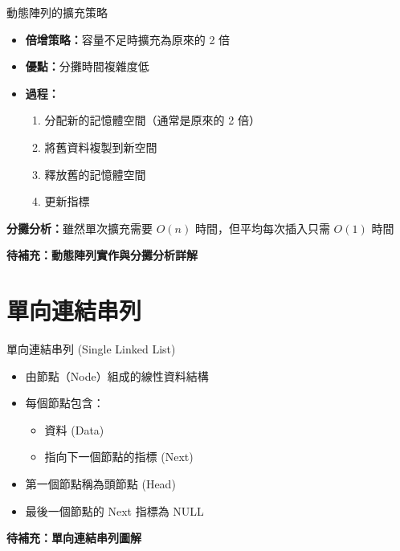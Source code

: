 \documentclass{beamer}
\begin{document}
\begin{frame}{動態陣列的擴充策略}
\begin{itemize}
    \item \textbf{倍增策略：}容量不足時擴充為原來的 2 倍
    \item \textbf{優點：}分攤時間複雜度低
    \item \textbf{過程：}
    \begin{enumerate}
        \item 分配新的記憶體空間（通常是原來的 2 倍）
        \item 將舊資料複製到新空間
        \item 釋放舊的記憶體空間
        \item 更新指標
    \end{enumerate}
\end{itemize}

\vspace{1em}
\textbf{分攤分析：}雖然單次擴充需要 $O(n)$ 時間，但平均每次插入只需 $O(1)$ 時間

\vspace{1em}
\textbf{待補充：動態陣列實作與分攤分析詳解}
\end{frame}

\section{單向連結串列}

\begin{frame}{單向連結串列 (Single Linked List)}
\begin{itemize}
    \item 由節點（Node）組成的線性資料結構
    \item 每個節點包含：
    \begin{itemize}
        \item 資料 (Data)
        \item 指向下一個節點的指標 (Next)
    \end{itemize}
    \item 第一個節點稱為頭節點 (Head)
    \item 最後一個節點的 Next 指標為 NULL
\end{itemize}

\vspace{1em}
\begin{center}
\textbf{待補充：單向連結串列圖解}
\end{center}
\end{frame}
\end{document}

